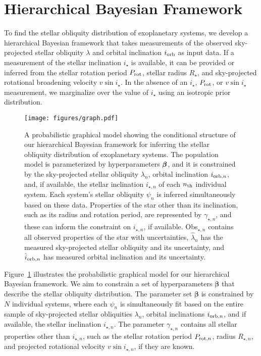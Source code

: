 \documentclass[twocolumn,times]{aastex631}
\begin{document}
\section{Hierarchical Bayesian Framework}\label{sec:hbm}

To find the stellar obliquity distribution of exoplanetary systems, we develop a hierarchical Bayesian framework that takes measurements of the observed sky-projected stellar obliquity $\lambda$ and orbital inclination $i_{\rm orb}$ as input data.
If a measurement of the stellar inclination $i_\star$ is available, it can be provided or inferred from the stellar rotation period $P_{\rm rot}$, stellar radius $R_\star$, and sky-projected rotational broadening velocity $v\sin{i}_\star$.
In the absence of an $i_\star$, $P_{\rm rot}$, or $v\sin{i}_\star$ measurement, we marginalize over the value of $i_\star$ using an isotropic prior distribution.

\begin{figure}[ht!]
    \texttt{[image: figures/graph.pdf]}
    \caption{A probabilistic graphical model showing the conditional structure of our hierarchical Bayesian framework for inferring the stellar obliquity distribution of exoplanetary systems. The population model is parameterized by hyperparameters $\vb*{\beta}$, and it is constrained by the sky-projected stellar obliquity $\lambda_n$, orbital inclination $i_{{\rm orb}, n}$, and, if available, the stellar inclination $i_{\star, n}$ of each $n_{\rm th}$ individual system. Each system's stellar obliquity $\psi_n$ is inferred simultaneously based on these data. 
    Properties of the star other than its inclination, such as its radius and rotation period, are represented by $\gamma_{\star, n}$, and these can inform the constraint on $i_{\star, n}$, if available. 
    Obs$_{\star,n}$ contains all observed properties of the star with uncertainties, $\hat{\lambda}_n$ has the measured sky-projected stellar obliquity and its uncertainty, and $\hat{i}_{{\rm orb}, n}$ has measured orbital inclination and its uncertainty.}
    \label{fig:graph}
\end{figure}

Figure~\ref{fig:graph} illustrates the probabilistic graphical model for our hierarchical Bayesian framework. We aim to constrain a set of hyperparameters $\bm{\beta}$ that describe the stellar obliquity distribution. The parameter set $\bm{\beta}$ is constrained by $N$ individual systems, where each $\psi_n$ is simultaneously fit based on the entire sample of sky-projected stellar obliquities $\lambda_n$, orbital inclinations $i_{{\rm orb},n}$, and if available, the stellar inclination $i_{\star, n}$. 
The parameter $\gamma_{\star, n}$ contains all stellar properties other than $i_{\star,n}$, such as the stellar rotation period $P_{{\rm rot},n}$, radius $R_{\star,n}$, and projected rotational velocity $v\sin{i_{\star,n}}$, if they are known.
\end{document}
